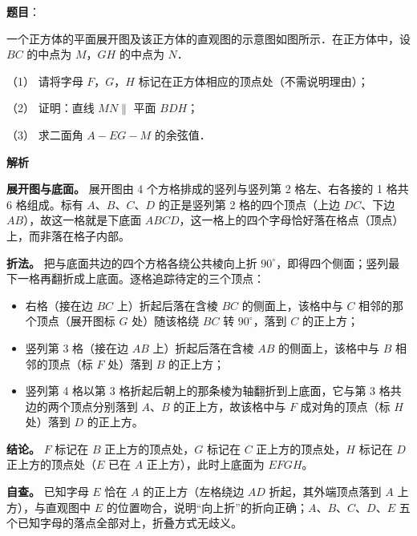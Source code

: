 \begin{answer}

\textbf{题目}：

一个正方体的平面展开图及该正方体的直观图的示意图如图所示．在正方体中，设 \(BC\) 的中点为 \(M\)，\(GH\) 的中点为 \(N\)．
\nopagebreak[4]
\begin{center}\end{center}
\nopagebreak[4]
（1） 请将字母 \(F\)，\(G\)，\(H\) 标记在正方体相应的顶点处（不需说明理由）；

（2） 证明：直线 \(MN\parallel\) 平面 \(BDH\)；

（3） 求二面角 \(A-EG-M\) 的余弦值．

\textbf{解析}


\textbf{展开图与底面。} 展开图由 4 个方格排成的竖列与竖列第 2 格左、右各接的 1 格共 6 格组成。标有 \(A\)、\(B\)、\(C\)、\(D\) 的正是竖列第 2 格的四个顶点（上边 \(DC\)、下边 \(AB\)），故这一格就是下底面 \(ABCD\)，这一格上的四个字母恰好落在格点（顶点）上，而非落在格子内部。

\textbf{折法。} 把与底面共边的四个方格各绕公共棱向上折 \(90^{\circ}\)，即得四个侧面；竖列最下一格再翻折成上底面。逐格追踪待定的三个顶点：

\begin{itemize}
\item 右格（接在边 \(BC\) 上）折起后落在含棱 \(BC\) 的侧面上，该格中与 \(C\) 相邻的那个顶点（展开图标 \(G\) 处）随该格绕 \(BC\) 转 \(90^{\circ}\)，落到 \(C\) 的正上方；
\item 竖列第 3 格（接在边 \(AB\) 上）折起后落在含棱 \(AB\) 的侧面上，该格中与 \(B\) 相邻的顶点（标 \(F\) 处）落到 \(B\) 的正上方；
\item 竖列第 4 格以第 3 格折起后朝上的那条棱为轴翻折到上底面，它与第 3 格共边的两个顶点分别落到 \(A\)、\(B\) 的正上方，故该格中与 \(F\) 成对角的顶点（标 \(H\) 处）落到 \(D\) 的正上方。
\end{itemize}

\textbf{结论。} \(F\) 标记在 \(B\) 正上方的顶点处，\(G\) 标记在 \(C\) 正上方的顶点处，\(H\) 标记在 \(D\) 正上方的顶点处（\(E\) 已在 \(A\) 正上方），此时上底面为 \(EFGH\)。

\textbf{自查。} 已知字母 \(E\) 恰在 \(A\) 的正上方（左格绕边 \(AD\) 折起，其外端顶点落到 \(A\) 上方），与直观图中 \(E\) 的位置吻合，说明“向上折”的折向正确；\(A\)、\(B\)、\(C\)、\(D\)、\(E\) 五个已知字母的落点全部对上，折叠方式无歧义。


\end{answer}
